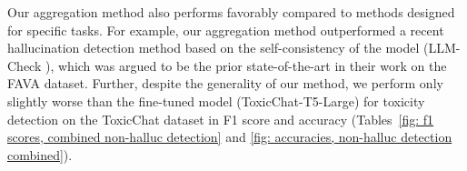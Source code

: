 Our aggregation method also performs favorably compared to methods designed for specific tasks. For example, our aggregation method outperformed a recent hallucination detection method based on the self-consistency of the model (LLM-Check \citep{LLMcheck}), which was argued to be the prior state-of-the-art in their work on the FAVA dataset. Further, despite the generality of our method, we perform only slightly worse than the fine-tuned model (ToxicChat-T5-Large) for toxicity detection on the ToxicChat dataset in F1 score and accuracy (Tables~\ref{fig: f1 scores, combined non-halluc detection} and \ref{fig: accuracies, non-halluc detection combined}). 